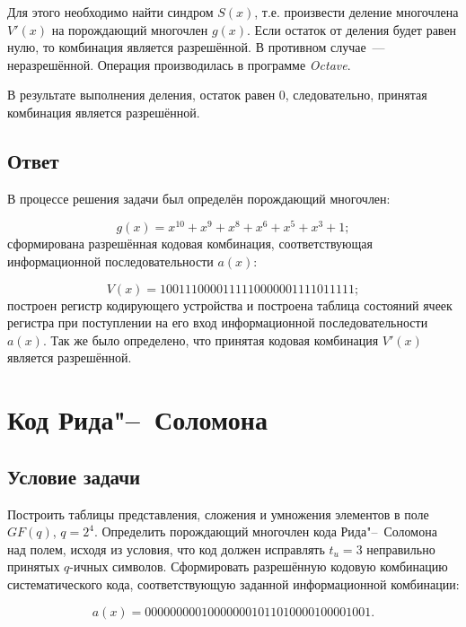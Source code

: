 Для этого необходимо найти синдром $S(x)$, т.е.  произвести деление
многочлена $V'(x)$ на порождающий многочлен $g(x)$. Если остаток от
деления будет равен нулю, то комбинация является разрешённой.  В
противном случае~--- неразрешённой. Операция производилась в
программе \textit{Octave}.

В результате выполнения деления, остаток равен 0, следовательно,
принятая комбинация является разрешённой.

\subsection{Ответ}

В процессе решения задачи был определён порождающий многочлен:

\begin{equation*}
g(x) = x^{10} + x^9 + x^8 + x^6 + x^5 + x^3 + 1;
\end{equation*}
сформирована разрешённая кодовая комбинация, соответствующая
информационной последовательности $a(x)$:

\begin{equation*}
V(x) = 1001110000111110000001111011111;
\end{equation*}
построен регистр кодирующего устройства и построена таблица состояний
ячеек регистра при поступлении на его вход информационной
последовательности $a(x)$. Так же было определено, что принятая кодовая
комбинация $V'(x)$ является разрешённой.
\newpage

\section{Код Рида"--~Соломона}
\label{sec:Reed-Solomon}

\subsection{Условие задачи}

Построить таблицы представления, сложения и умножения элементов в поле
$GF(q)$, $q = 2^4$. Определить порождающий многочлен кода
Рида"--~Соломона над полем, исходя из условия, что код должен
исправлять $t_u = 3$ неправильно принятых $q$-ичных
символов. Сформировать разрешённую кодовую комбинацию систематического
кода, соответствующую заданной информационной комбинации:

\begin{equation*}
  a(x) = 000000000100000001011010000100001001.
\end{equation*}

